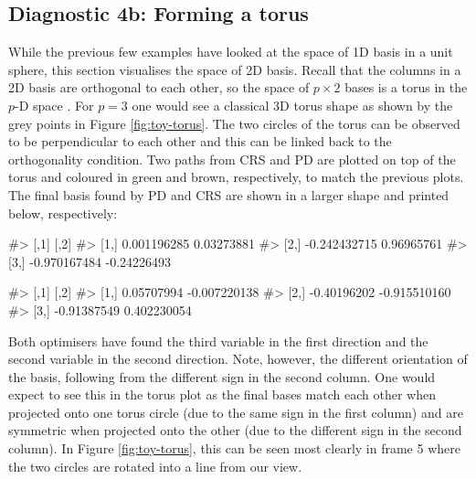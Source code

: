 \hypertarget{diagnostic-4b-forming-a-torus}{%
\subsection{Diagnostic 4b: Forming a
torus}\label{diagnostic-4b-forming-a-torus}}

While the previous few examples have looked at the space of 1D basis in
a unit sphere, this section visualises the space of 2D basis. Recall
that the columns in a 2D basis are orthogonal to each other, so the
space of \(p \times 2\) bases is a torus in the \(p\)-D space
\citep{Buja1986-sw}. For \(p = 3\) one would see a classical 3D torus
shape as shown by the grey points in Figure \ref{fig:toy-torus}. The two
circles of the torus can be observed to be perpendicular to each other
and this can be linked back to the orthogonality condition. Two paths
from CRS and PD are plotted on top of the torus and coloured in green
and brown, respectively, to match the previous plots. The final basis
found by PD and CRS are shown in a larger shape and printed below,
respectively:

\begin{Schunk}
\begin{Soutput}
#>              [,1]        [,2]
#> [1,]  0.001196285  0.03273881
#> [2,] -0.242432715  0.96965761
#> [3,] -0.970167484 -0.24226493
\end{Soutput}
\end{Schunk}

\begin{Schunk}
\begin{Soutput}
#>             [,1]         [,2]
#> [1,]  0.05707994 -0.007220138
#> [2,] -0.40196202 -0.915510160
#> [3,] -0.91387549  0.402230054
\end{Soutput}
\end{Schunk}

Both optimisers have found the third variable in the first direction and
the second variable in the second direction. Note, however, the
different orientation of the basis, following from the different sign in
the second column. One would expect to see this in the torus plot as the
final bases match each other when projected onto one torus circle (due
to the same sign in the first column) and are symmetric when projected
onto the other (due to the different sign in the second column). In
Figure \ref{fig:toy-torus}, this can be seen most clearly in frame 5
where the two circles are rotated into a line from our view.

